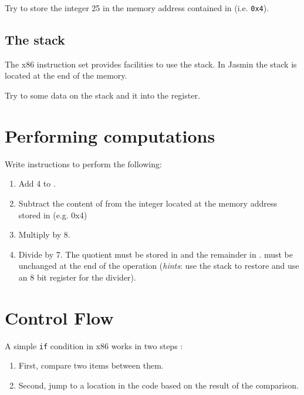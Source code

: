 \documentclass{../../tp}
\begin{document}
\begin{instruction}
	Try to store the integer 25 in the memory address contained in  (i.e. \texttt{0x4}).
\end{instruction}


\subsection{The stack}

The x86 instruction set provides facilities to use the stack. In \textsf{Jasmin} the stack is located at the end of the memory. 

\begin{instruction}
	Try to  some data on the stack and  it into the  register.
\end{instruction}


\section{Performing computations}


\begin{instruction}
	Write instructions to perform the following:
	\begin{enumerate}
		\item Add 4 to .
		\item Subtract the content of  from the integer located at the memory address stored in  (e.g. 0x4)
		\item Multiply  by 8.
		\item Divide  by 7. The quotient must be stored in  and the remainder in .
		 must be unchanged at the end of the operation 
		(\emph{hints}: use the stack to restore  and use an 8 bit register for the divider).
	\end{enumerate}
\end{instruction}


\section{Control Flow}

A simple \texttt{if} condition in x86 works in two steps : 
\begin{enumerate}
	\item First, compare two items between them.
	\item Second, jump to a location in the code based on the result of the comparison.
\end{enumerate}
\end{document}
